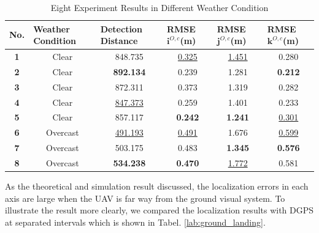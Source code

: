\begin{table}[!th]
	\centering
	\caption{Eight Experiment Results in Different Weather Condition}
	\label{lab:eight_ground_landing}
	\begin{tabular}{cccccc}
		\hline
		\multicolumn{1}{l}{\textbf{No.}} & \multicolumn{1}{l}{\textbf{Weather Condition}} & \multicolumn{1}{l}{\textbf{Detection Distance}} & \multicolumn{1}{l}{\textbf{RMSE $\mathbf{i}^{O,c}$(m)}} & \multicolumn{1}{l}{\textbf{RMSE $\mathbf{j}^{O,c}$(m)}} & \multicolumn{1}{l}{\textbf{RMSE $\mathbf{k}^{O,c}$(m)}} \\ \hline
		\textbf{1} & Clear & 848.735 & \underline{0.325} & \underline{1.451} & 0.280 \\
		\textbf{2} & Clear & \textbf{892.134} & 0.239 & 1.281 & \textbf{0.212} \\
		\textbf{3} & Clear & 872.311 & 0.373 & 1.319 & 0.282 \\
		\textbf{4} & Clear & \underline{847.373} & 0.259 & 1.401 & 0.233 \\
		\textbf{5} & Clear & 857.117 & \textbf{0.242} & \textbf{1.241} & \underline{0.301} \\ \hline
		\textbf{6} & Overcast & \underline{491.193} & \underline{0.491} & 1.676 & \underline{0.599} \\
		\textbf{7} & Overcast & 503.175 & 0.483 & \textbf{1.345} & \textbf{0.576} \\
		\textbf{8} & Overcast & \textbf{534.238} & \textbf{0.470} & \underline{1.772} & 0.581 \\ \hline
	\end{tabular}
\end{table}


As the theoretical and simulation result discussed, the localization errors in each axis are large when the UAV is far way from the ground visual system. To illustrate the result more clearly, we compared the localization results with DGPS at separated intervals which is shown in Tabel. \ref{lab:ground_landing}.


